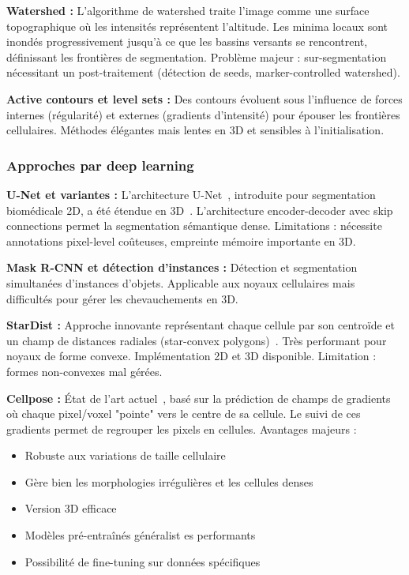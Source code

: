 \textbf{Watershed :}
L'algorithme de watershed traite l'image comme une surface topographique où les intensités représentent l'altitude. Les minima locaux sont inondés progressivement jusqu'à ce que les bassins versants se rencontrent, définissant les frontières de segmentation. Problème majeur : sur-segmentation nécessitant un post-traitement (détection de seeds, marker-controlled watershed).

\textbf{Active contours et level sets :}
Des contours évoluent sous l'influence de forces internes (régularité) et externes (gradients d'intensité) pour épouser les frontières cellulaires. Méthodes élégantes mais lentes en 3D et sensibles à l'initialisation.

\subsubsection{Approches par deep learning}

\textbf{U-Net et variantes :}
L'architecture U-Net~\cite{Ronneberger2015}, introduite pour segmentation biomédicale 2D, a été étendue en 3D~\cite{Cicek2016}. L'architecture encoder-decoder avec skip connections permet la segmentation sémantique dense. Limitations : nécessite annotations pixel-level coûteuses, empreinte mémoire importante en 3D.

\textbf{Mask R-CNN et détection d'instances :}
Détection et segmentation simultanées d'instances d'objets. Applicable aux noyaux cellulaires mais difficultés pour gérer les chevauchements en 3D.

\textbf{StarDist :}
Approche innovante représentant chaque cellule par son centroïde et un champ de distances radiales (star-convex polygons)~\cite{Schmidt2018}. Très performant pour noyaux de forme convexe. Implémentation 2D et 3D disponible. Limitation : formes non-convexes mal gérées.

\textbf{Cellpose :}
État de l'art actuel~\cite{Stringer2021}, basé sur la prédiction de champs de gradients où chaque pixel/voxel "pointe" vers le centre de sa cellule. Le suivi de ces gradients permet de regrouper les pixels en cellules. Avantages majeurs :
\begin{itemize}
    \item Robuste aux variations de taille cellulaire
    \item Gère bien les morphologies irrégulières et les cellules denses
    \item Version 3D efficace
    \item Modèles pré-entraînés généralist es performants
    \item Possibilité de fine-tuning sur données spécifiques
\end{itemize}


